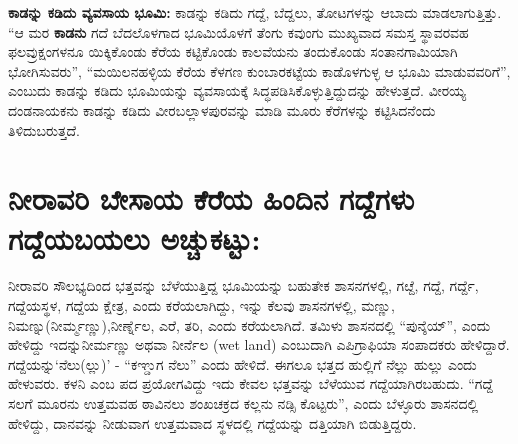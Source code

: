 \textbf{ಕಾಡನ್ನು ಕಡಿದು ವ್ಯವಸಾಯ ಭೂಮಿ:} ಕಾಡನ್ನು ಕಡಿದು ಗದ್ದೆ, ಬೆದ್ದಲು, ತೋಟಗಳನ್ನು ಆಬಾದು ಮಾಡಲಾಗುತ್ತಿತ್ತು. “ಆ ಮರ \textbf{ಕಾಡನು} ಗದೆ ಬೆದಲೊಳಗಾದ ಭೂಮಿಯೊಳಗೆ ತೆಂಗು ಕವುಂಗು ಮುಖ್ಯವಾದ ಸಮಸ್ತ ಸ್ಥಾವರವಹ ಫಲವ್ರುಕ್ಷಂ\break ಗಳನೂ ಯಿಕ್ಕಿಕೊಂಡು ಕೆರೆಯ ಕಟ್ಟಿಕೊಂಡು ಕಾಲವೆಯನು ತಂದುಕೊಂಡು ಸಂತಾನಗಾಮಿಯಾಗಿ ಭೋಗಿಸುವರು”, “ಮಯಿಲನಹಳ್ಳಿಯ ಕೆರೆಯ ಕೆಳಗಣ ಕುಂಬಾರಕಟ್ಟೆಯ ಕಾಡೊಳಗುಳ್ಳ ಆ ಭೂಮಿ ಮಾಡುವವರಿಗೆ”, ಎಂಬುದು ಕಾಡನ್ನು ಕಡಿದು ಭೂಮಿಯನ್ನು ವ್ಯವಸಾಯಕ್ಕೆ ಸಿದ್ಧಪಡಿಸಿಕೊಳ್ಳುತ್ತಿದ್ದುದನ್ನು ಹೇಳುತ್ತದೆ. ವೀರಯ್ಯ ದಂಡನಾಯಕನು ಕಾಡನ್ನು ಕಡಿದು ವೀರಬಲ್ಲಾಳಪುರವನ್ನು ಮಾಡಿ ಮೂರು ಕೆರೆಗಳನ್ನು ಕಟ್ಟಿಸಿದನೆಂದು ತಿಳಿದುಬರುತ್ತದೆ.


\section{ನೀರಾವರಿ ಬೇಸಾಯ \enginline{-} ಕೆರೆಯ ಹಿಂದಿನ ಗದ್ದೆಗಳು \enginline{-} ಗದ್ದೆಯಬಯಲು \enginline{-} ಅಚ್ಚುಕಟ್ಟು:}

ನೀರಾವರಿ ಸೌಲಭ್ಯದಿಂದ ಭತ್ತವನ್ನು ಬೆಳೆಯುತ್ತಿದ್ದ ಭೂಮಿಯನ್ನು ಬಹುತೇಕ ಶಾಸನಗಳಲ್ಲಿ, ಗೞ್ದೆ, ಗದ್ದೆ, ಗರ್ದ್ದೆ, ಗದ್ದೆಯ\break ಸ್ಥಳ, ಗದ್ದೆಯ ಕ್ಷೇತ್ರ, ಎಂದು ಕರೆಯಲಾಗಿದ್ದು, ಇನ್ನು ಕೆಲವು ಶಾಸನಗಳಲ್ಲಿ, ಮಣ್ಣು, ನಿಮಣ್ನು(ನೀರ್ಮ್ಮಣ್ಣು),\break ನೀರ್ಣ್ನೆಲ, ಎರೆ, ತರಿ, ಎಂದು ಕರೆಯಲಾಗಿದೆ. ತಮಿಳು ಶಾಸನದಲ್ಲಿ “ಪುನ್ಶೆಯ್​”, ಎಂದು ಹೇಳಿದ್ದು ಇದನ್ನು\break ನೀರ್ಮಣ್ಣು ಅಥವಾ ನೀರ್ನೆಲ (wet land) ಎಂಬುದಾಗಿ ಎಪಿಗ್ರಾಫಿಯಾ ಸಂಪಾದಕರು ಹೇಳಿದ್ದಾರೆ. ಗದ್ದೆಯನ್ನು\break ‘ನೆಲು(ಲ್ಲು)’ - “ಕಞ್ಡುಗ ನೆಲು” ಎಂದು ಹೇಳಿದೆ. ಈಗಲೂ ಭತ್ತದ ಹುಲ್ಲಿಗೆ ನೆಲ್ಲು ಹುಲ್ಲು ಎಂದು ಹೇಳುವರು. ಕಳನಿ ಎಂಬ ಪದ ಪ್ರಯೋಗವಿದ್ದು ಇದು ಕೇವಲ ಭತ್ತವನ್ನು ಬೆಳೆಯುವ ಗದ್ದೆಯಾಗಿರಬಹುದು. “ಗದ್ದೆ ಸಲಗೆ ಮೂರನು ಉತ್ತಮವಹ ಠಾವಿನಲು ಶಂಖಚಕ್ರದ ಕಲ್ಲನು ನಡ್ಸಿ ಕೊಟ್ಟರು”, ಎಂದು ಬೆಳ್ಳೂರು ಶಾಸನದಲ್ಲಿ ಹೇಳಿದ್ದು, ದಾನವನ್ನು ನೀಡುವಾಗ ಉತ್ತಮವಾದ ಸ್ಥಳದಲ್ಲಿ ಗದ್ದೆಯನ್ನು ದತ್ತಿಯಾಗಿ ಬಿಡುತ್ತಿದ್ದರು.

\vskip 2pt

